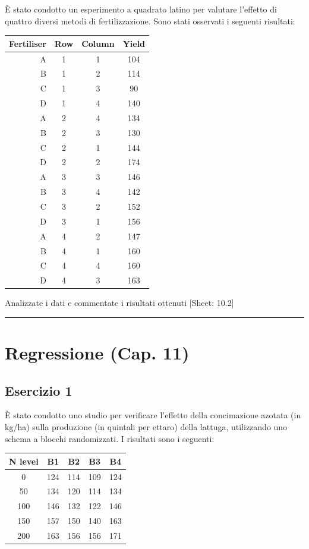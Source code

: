 \documentclass[a4paper,12pt,oneside]{book}
\begin{document}
È stato condotto un esperimento a quadrato latino per valutare l'effetto di quattro diversi metodi di fertilizzazione. Sono stati osservati i seguenti risultati:

\begin{longtable}[]{@{}rccc@{}}
\toprule
Fertiliser & Row & Column & Yield \\
\midrule
\endhead
A & 1 & 1 & 104 \\
B & 1 & 2 & 114 \\
C & 1 & 3 & 90 \\
D & 1 & 4 & 140 \\
A & 2 & 4 & 134 \\
B & 2 & 3 & 130 \\
C & 2 & 1 & 144 \\
D & 2 & 2 & 174 \\
A & 3 & 3 & 146 \\
B & 3 & 4 & 142 \\
C & 3 & 2 & 152 \\
D & 3 & 1 & 156 \\
A & 4 & 2 & 147 \\
B & 4 & 1 & 160 \\
C & 4 & 4 & 160 \\
D & 4 & 3 & 163 \\
\bottomrule
\end{longtable}

Analizzate i dati e commentate i risultati ottenuti
{[}Sheet: 10.2{]}

\begin{center}\rule{0.5\linewidth}{0.5pt}\end{center}

\hypertarget{regressione-cap.-11}{%
\section{Regressione (Cap. 11)}\label{regressione-cap.-11}}

\hypertarget{esercizio-1-7}{%
\subsection{Esercizio 1}\label{esercizio-1-7}}

È stato condotto uno studio per verificare l'effetto della concimazione azotata (in kg/ha) sulla produzione (in quintali per ettaro) della lattuga, utilizzando uno schema a blocchi randomizzati. I risultati sono i seguenti:

\begin{longtable}[]{@{}ccccc@{}}
\toprule
N level & B1 & B2 & B3 & B4 \\
\midrule
\endhead
0 & 124 & 114 & 109 & 124 \\
50 & 134 & 120 & 114 & 134 \\
100 & 146 & 132 & 122 & 146 \\
150 & 157 & 150 & 140 & 163 \\
200 & 163 & 156 & 156 & 171 \\
\bottomrule
\end{longtable}
\end{document}
